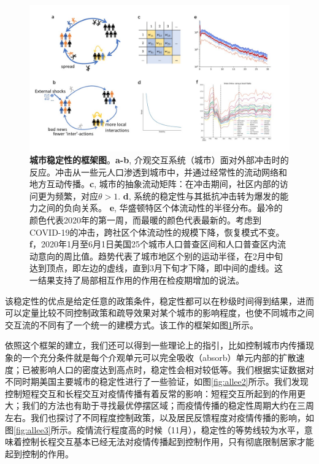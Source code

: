 \begin{figure}
    \centering
    \includegraphics[width = 0.9\linewidth]{Figs/Figure1.jpg}
    \caption{\textbf{城市稳定性的框架图}。\textbf{a-b}, 介观交互系统（城市）面对外部冲击时的反应。冲击从一些元人口渗透到城市中，并通过经常性的流动网络和地方互动传播。\textbf{c}, 城市的抽象流动矩阵：在冲击期间，社区内部的访问更为频繁，对应$\theta > 1$. \textbf{d}, 系统的稳定性与其抵抗冲击转为爆发的能力之间的负向关系。 \textbf{e}, 华盛顿特区个体流动性的半径分布。最冷的颜色代表2020年的第一周，而最暖的颜色代表最新的。考虑到COVID-19的冲击，跨社区个体流动性的规模下降，恢复模式不变。\textbf{f}，2020年1月至6月1日美国25个城市人口普查区间和人口普查区内流动意向的周比值。趋势代表了城市地区个别的运动半径，在2月中旬达到顶点，即左边的虚线，直到3月下旬才下降，即中间的虚线。这一结果支持了局部相互作用的作用在检疫期增加的说法。}
    \label{fig:allee1}
\end{figure} 该稳定性的优点是给定任意的政策条件，稳定性都可以在秒级时间得到结果，进而可以定量比较不同控制政策和疏导效果对某个城市的影响程度，也使不同城市之间交互流的不同有了一个统一的建模方式。该工作的框架如图\ref{fig:allee1}所示。

依照这个框架的建立，我们还可以得到一些理论上的指引，比如控制城市内传播现象的一个充分条件就是每个介观单元可以完全吸收（absorb）单元内部的扩散速度；已被影响人口的密度达到高点时，稳定性会相对较低等。我们根据实证数据\cite{kang2020multiscale}对不同时期美国主要城市的稳定性进行了一些验证，如图\ref{fig:allee2}所示。我们发现控制短程交互和长程交互对疫情传播有着反常的影响：短程交互所起到的作用更大；我们的方法也有助于寻找最优停摆区域；而疫情传播的稳定性周期大约在三周左右。我们也探讨了不同程度控制政策，以及居民反馈程度对疫情传播的影响，如图\ref{fig:allee3}所示。疫情流行程度高的时候（11月），稳定性的等势线较为水平，意味着控制长程交互基本已经无法对疫情传播起到控制作用，只有彻底限制居家才能起到控制的作用。

